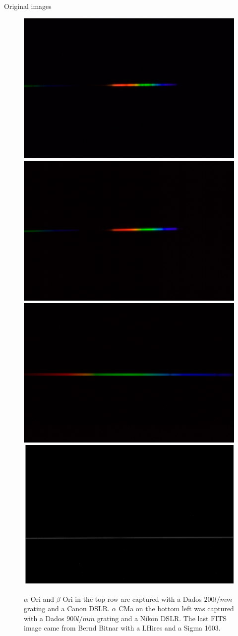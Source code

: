 \documentclass[final,t]{beamer}
\begin{document}
\begin{frame}
\begin{columns}[t]
\begin{column}{.32\linewidth}
\begin{block}{Original images}
					\begin{figure}
						\includegraphics[width=0.49\columnwidth]{img/alpori.png}
						\includegraphics[width=0.49\columnwidth]{img/betori.png} \\
						\includegraphics[width=0.49\columnwidth]{img/alpcma.png}
						\includegraphics[width=0.49\columnwidth]{img/alpleo.png}
						
						\caption[orig]%
						{$\alpha$ Ori and $\beta$ Ori in the top row are captured with a Dados $200 l/mm$ grating and a Canon DSLR.
							$\alpha$ CMa on the bottom left was captured with a Dados $900 l/mm$ grating and a Nikon DSLR.
							The last FITS image came from Bernd Bitnar with a LHires and a Sigma 1603.}
						\label{fig:orig}
					\end{figure}



\end{block}
\end{column}
\end{columns}
\end{frame}
\end{document}
